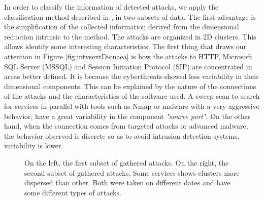 \documentclass[a4paper]{llncs}
\begin{document}
In order to classify the information of detected attacks, we apply the classification method described in \cite{panda-2009}, in two subsets of data. The first advantage is the simplification of the collected information derived from the dimensional reduction intrinsic to the method. The attacks are organized in 2D clusters.  This allows identify some interesting characteristics. The first thing that draws our attention in Figure \ref{fig:intvsextDionaea} is how the attacks to HTTP, Microsoft SQL Server (MSSQL) and Session Initiation Protocol (SIP) are concentrated in areas better defined. It is because the cyberthreats showed less variability in their dimensional components. This can be explained by the nature of the connections of the attacks and the characteristics of the software used. A sweep scan to search for services in parallel with tools such as Nmap \cite{nmap} or malware with a very aggressive behavior, have a great variability in the component {\it"source port"}. On the other hand, when the connection comes from targeted attacks or advanced malware, the behavior observed is discrete so as to avoid intrusion detection systems, variability is lower.

\begin{figure}[h]
	\label{fig:intvsextDionaea}
	\label{fig:intvsextKippo}
	\caption{On the left, the first subset of gathered attacks. On the right, the second subset of gathered attacks. Some services shows clusters more dispersed than other. Both  were taken on different dates and have some different types of attacks.}
\end{figure}
\end{document}
